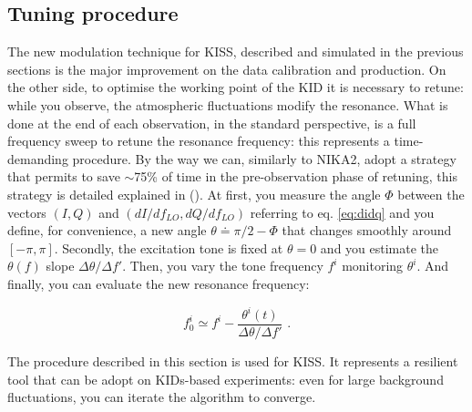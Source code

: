 \subsection{Tuning procedure}
\label{sec:tuning}

The new modulation technique for KISS, described and simulated in the previous sections is the major improvement on the data calibration and production. On the other side, to optimise the working point of the KID it is necessary to retune: while you observe, the atmospheric fluctuations modify the resonance. What is done at the end of each observation, in the standard perspective, is a full frequency sweep to retune the resonance frequency: this represents a time-demanding procedure. By the way we can, similarly to NIKA2, adopt a strategy that permits to save $\sim$75\% of time in the pre-observation phase of retuning, this strategy is detailed explained in (\cite{2014SPIE.9153E..02C}). At first, you measure the angle $\Phi$ between the vectors $(I,Q)$ and $(dI/df_{LO},dQ/df_{LO})$ referring to eq. \ref{eq:didq} and you define, for convenience, a new angle $\theta\doteq \pi/2-\Phi$ that changes smoothly around $[-\pi,\pi]$. Secondly, the excitation tone is fixed at $\theta=0$ and you estimate the $\theta(f)$ slope $\Delta\theta/\Delta f'$. Then, you vary the tone frequency $f^i$ monitoring $\theta^i$. And finally, you can evaluate the new resonance frequency:

\begin{equation}
f^i_0 \simeq f^i - \frac{\theta^i(t)}{\Delta\theta/\Delta f'} \text{ .}
\end{equation}

The procedure described in this section is used for KISS. It represents a resilient tool that can be adopt on KIDs-based experiments: even for large background fluctuations, you can iterate the algorithm to converge.


